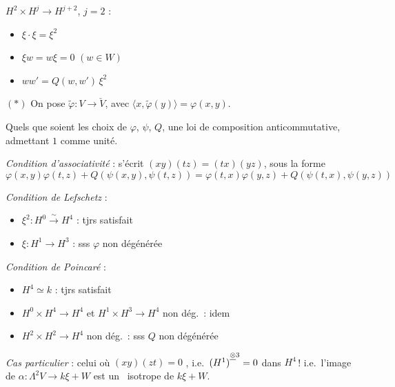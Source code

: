 \documentclass[11pt,a4paper]{article}
\begin{document}
$H^{2} \times H^{j} \to H^{j+2}$, $j = 2$ :
\begin{itemize}
\item $\xi \cdot \xi = \xi^{2}$
\item $\xi w = w\xi = 0$ \quad $(w \in W)$
\item $ww' = Q(w,w')\,\xi^{2}$
\end{itemize}

$(*)$ On pose $\tilde\varphi : V \to \check{V}$, avec
$\langle x, \tilde\varphi(y)\rangle = \varphi(x,y)$.

Quels que soient les choix de $\varphi$, $\psi$, $Q$, \ill{} 
une loi de composition anticommutative, admettant $1$ comme unité.

\emph{Condition d'associativité} : s'écrit $(xy)(tz) = (tx)(yz)$,
sous la forme
\[
\varphi(x,y)\varphi(t,z) + Q(\psi(x,y), \psi(t,z))
 = \varphi(t,x)\varphi(y,z) + Q(\psi(t,x), \psi(y,z))
\]


\emph{Condition de Lefschetz} :
\begin{itemize}
\item $\xi^{2} : H^{0} \xrightarrow{\ \sim\ } H^{4}$ : tjrs satisfait
\item $\xi : H^{1} \to H^{3}$ : sss $\varphi$ non dégénérée
\end{itemize}

\emph{Condition de Poincaré} :
\begin{itemize}
\item $H^{4} \simeq k$ : tjrs satisfait
\item $H^{0} \times H^{4} \to H^{4}$ et $H^{1} \times H^{3} \to H^{4}$ non dég.\ : idem
\item $H^{2} \times H^{2} \to H^{4}$ non dég.\ : sss $Q$ non dégénérée
\end{itemize}


\emph{Cas particulier} : celui où $(xy)(zt) = 0$ , i.e.\ $(H^{1})^{\struck{\otimes}3} = 0$ dans $H^{4}$\,!
i.e.\ l'image de $\alpha : \Lambda^{2}V \to k\xi + W$ est \struck{\ill{}} un
\ isotrope de $k\xi + W$.
\end{document}
